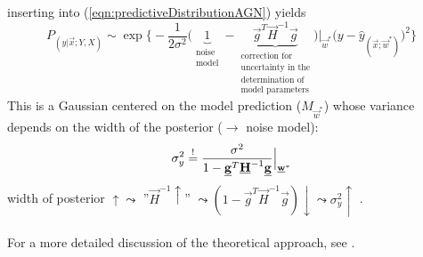 inserting into (\ref{eqn:predictiveDistributionAGN}) yields
\begin{equation}
	P_{(y|\vec{x};Y,X)} \sim \exp \bigg\{ -\frac{1}{2\sigma^2} 
	\big( \underbrace{ 1 }_{\substack{ \text{noise} \\ \text{model}}}
	- \underbrace{ \vec{g}^T \vec{H}^{-1} \vec{g} }_{
		\substack{	\text{correction for} \\
				\text{uncertainty in the} \\
				\text{determination of} \\
				\text{model parameters}} }
	\big) \Big|_{\vec{w}^*} \big( y - \widehat{y}_{(\vec{x}; \vec{w}^*)}
	\big)^2 \bigg\}
\end{equation}
This is a Gaussian centered on the model prediction ($M_{\vec{w}^*}$) whose
variance depends on the width of the posterior ($\rightarrow$ noise
model):
\begin{equation}
  \sigma_y^2 \stackrel{\mathrm{!}}{=} \frac{\sigma^2}{1 - \underline{\mathbf{g}}^T \underline{\mathbf{H}}^{-1} \underline{\mathbf{g}}} \Big|_{\underline{\mathbf{w}}^*}
\end{equation}
width of posterior $\uparrow \leadsto$ ''$\vec{H}^{-1} \uparrow$''
$\leadsto (1 - \vec{g}^T \vec{H}^{-1} \vec{g}) \downarrow \leadsto
\sigma_y^2 \uparrow$ .\\\\
For a more detailed discussion of the theoretical approach, see \textcite{MacKay1992c}.

